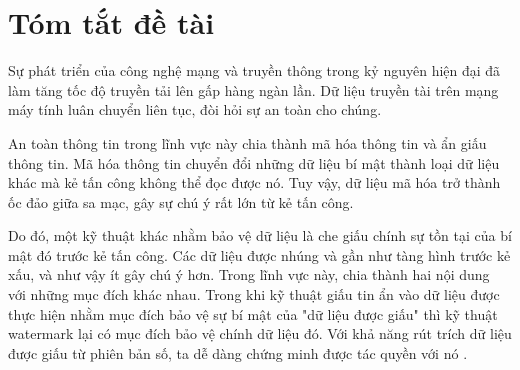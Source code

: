 \chapter*{\centering\Large{Tóm tắt đề tài}}


Sự phát triển của công nghệ mạng và truyền thông trong kỷ nguyên hiện đại đã làm tăng tốc độ truyền tải lên gấp hàng ngàn lần. Dữ liệu truyền tài trên mạng máy tính luân chuyển liên tục, đòi hỏi sự an toàn cho chúng. 

An toàn thông tin trong lĩnh vực này chia thành mã hóa thông tin và ẩn giấu thông tin. Mã hóa thông tin chuyển đổi những dữ liệu bí mật thành loại dữ liệu khác mà kẻ tấn công không thể đọc được nó. Tuy vậy, dữ liệu mã hóa trở thành ốc đảo giữa sa mạc, gây sự chú ý rất lớn từ kẻ tấn công. 

Do đó, một kỹ thuật khác nhằm bảo vệ dữ liệu là che giấu chính sự tồn tại của bí mật đó trước kẻ tấn công. Các dữ liệu được nhúng và gần như tàng hình trước kẻ xấu, và như vậy ít gây chú ý hơn. Trong lĩnh vực này, chia thành hai nội dung với những mục đích khác nhau. Trong khi kỹ thuật giấu tin ẩn vào dữ liệu được thực hiện nhằm mục đích bảo vệ sự bí mật của "dữ liệu được giấu" thì kỹ thuật watermark lại có mục đích bảo vệ chính dữ liệu đó. Với khả năng rút trích dữ liệu được giấu từ phiên bản số, ta dễ dàng chứng minh được tác quyền với nó \cite{subhedar2014current}.



